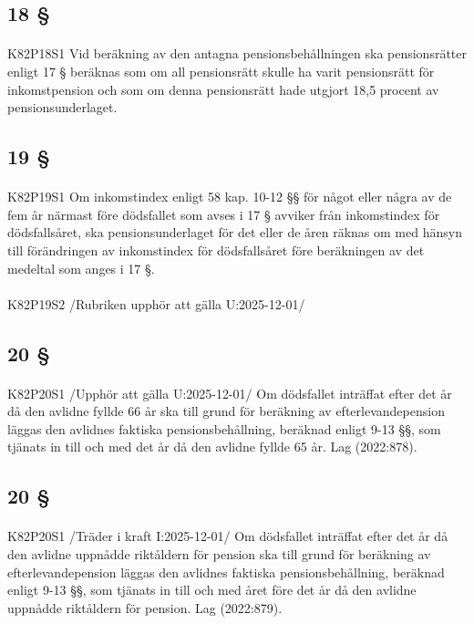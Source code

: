 \documentclass[a4paper,notitlepage,openany,10pt]{book}
\begin{document}
\subsection*{18 §}
\paragraph*{}
{\tiny K82P18S1}
Vid beräkning av den antagna pensionsbehållningen ska pensionsrätter enligt 17 § beräknas som om all pensionsrätt skulle ha varit pensionsrätt för inkomstpension och som om denna pensionsrätt hade utgjort 18,5 procent av pensionsunderlaget.
\subsection*{19 §}
\paragraph*{}
{\tiny K82P19S1}
Om inkomstindex enligt 58 kap. 10-12 §§ för något eller några av de fem år närmast före dödsfallet som avses i 17 § avviker från inkomstindex för dödsfallsåret, ska pensionsunderlaget för det eller de åren räknas om med hänsyn till förändringen av inkomstindex för dödsfallsåret före beräkningen av det medeltal som anges i 17 §.
\paragraph*{}
{\tiny K82P19S2}
/Rubriken upphör att gälla U:2025-12-01/
\subsection*{20 §}
\paragraph*{}
{\tiny K82P20S1}
/Upphör att gälla U:2025-12-01/
Om dödsfallet inträffat efter det år då den avlidne fyllde 66 år ska till grund för beräkning av efterlevandepension läggas den avlidnes faktiska pensionsbehållning, beräknad enligt 9-13 §§, som tjänats in till och med det år då den avlidne fyllde 65 år.
Lag (2022:878).
\subsection*{20 §}
\paragraph*{}
{\tiny K82P20S1}
/Träder i kraft I:2025-12-01/
Om dödsfallet inträffat efter det år då den avlidne uppnådde riktåldern för pension ska till grund för beräkning av efterlevandepension läggas den avlidnes faktiska pensionsbehållning, beräknad enligt 9-13 §§, som tjänats in till och med året före det år då den avlidne uppnådde riktåldern för pension.
Lag (2022:879).
\end{document}
